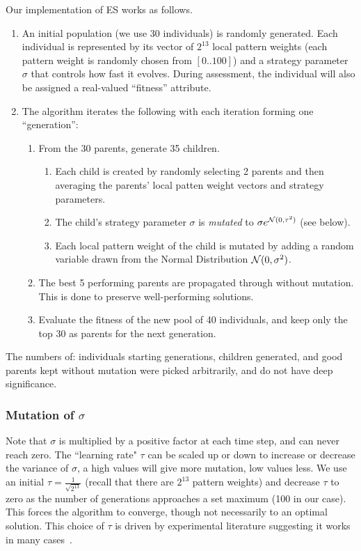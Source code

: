 \documentclass{acm_proc_article-sp}
\begin{document}
Our implementation of ES works as follows.
\begin{enumerate}
\item An initial population (we use 30 individuals) is randomly generated. 
Each individual is represented by its vector of $2^{13}$ local pattern weights 
(each pattern weight is randomly chosen from $[0 .. 100]$)
and a strategy parameter $\sigma$ that controls how fast it evolves.
During assessment, the individual will also be assigned a real-valued ``fitness'' attribute.
\item The algorithm iterates the following with each iteration forming one ``generation'':
	\begin{enumerate}
	\item From the 30 parents, generate 35 children.
		\begin{enumerate}
		\item Each child is created by randomly selecting 2 parents and then 
		averaging the parents' local patten weight vectors and strategy parameters.
		\item	The child's strategy parameter $\sigma$ is \emph{mutated} to $\sigma e^{ {\cal N}(0,\tau^2)}$
			(see below).
		\item Each local pattern weight of the child is mutated by adding a random variable drawn from the Normal Distribution
		${\cal N}(0, \sigma^2)$.
		\end{enumerate}
	\item The best 5 performing parents are propagated through without mutation.  This is done to preserve well-performing solutions.
	\item Evaluate the fitness of the new pool of 40 individuals, and keep only the top 30 as parents for the next generation.
	\end{enumerate}
\end{enumerate}

The numbers of:  individuals starting generations, children generated, and good parents kept without mutation
were picked arbitrarily, and do not have deep significance.

\subsubsection*{Mutation of $\sigma$}
Note that $\sigma$ is multiplied by a positive factor at each time step, and can never reach zero. 
The ``learning rate" $\tau$  can be scaled up or down to increase or decrease the variance of $\sigma$, a high values will give more mutation, low values less. 
We use an initial $\tau = \frac{1}{\sqrt{2^{13}}}$ (recall that there are $2^{13}$  pattern weights) and decrease $\tau$ to zero 
as the number of generations approaches a set maximum (100 in our case). 
This forces the algorithm to converge, though not necessarily to an optimal solution. 
This choice of $\tau$ is driven by experimental literature suggesting it works in many cases~\cite{Beyer:2007}.
\end{document}
